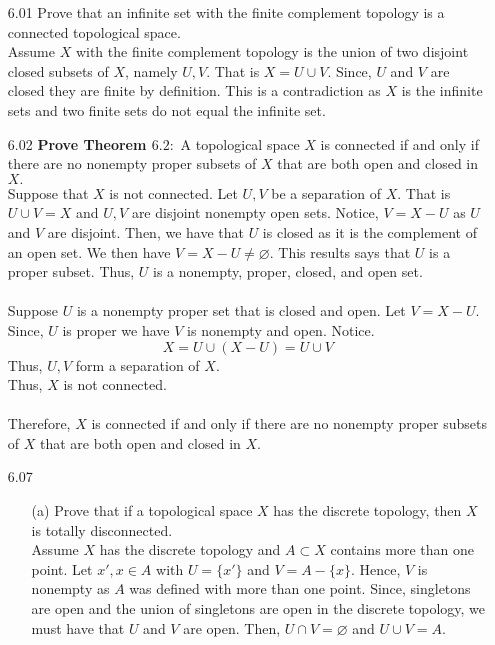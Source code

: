 \documentclass[12pt]{article}
\begin{document}
	\pagestyle{fancy}  
	\lfoot{} \cfoot{} \rfoot{}
	
	\begin{enumerate}
		\item[6.01] Prove that an infinite set with the finite complement topology is a connected
		topological space.\\
		Assume $ X $ with the finite complement topology is the union of two disjoint closed subsets of $ X $, namely $ U,V $. That is $ X= U\cup V $. Since, $ U$ and $V $ are closed they are finite by definition. This is a contradiction as $ X $ is the infinite sets and two finite sets do not equal the infinite set.
		
		\item[6.02] \textbf{Prove Theorem $6.2 :$} A topological space $X$ is connected if and only if there are no nonempty proper subsets of $X$ that are both open and closed in $X .$\\
		Suppose that $ X $ is not connected. Let $ U,V $ be a separation of $ X $. That is $ U\cup V = X$ and $ U,V $ are disjoint nonempty open sets. Notice, $ V=X-U  $ as $ U $ and $ V $ are disjoint. Then, we have that $ U $ is closed as it is the complement of an open set. We then have $ V=X-U\not= \varnothing $. This results says that $ U $ is a proper subset. Thus, $ U $ is a nonempty, proper, closed, and open set.\\
		\\
		Suppose $ U$ is a nonempty proper set that is closed and open. Let $ V=X-U $. Since, $ U $ is proper we have $ V $ is nonempty and open. Notice.
			\[X=U\cup(X-U)=U\cup V\]
		Thus, $ U,V $ form a separation of $ X $.\\
		Thus, $ X $ is not connected.\\
		\\
		Therefore, $X$ is connected if and only if there are no nonempty proper subsets of $X$ that are both open and closed in $X .$\\
		\item[6.07] \begin{enumerate}
			\item[(a)]  Prove that if a topological space $X$ has the discrete topology, then $X$ is totally disconnected.\\
			Assume $ X $ has the discrete topology and $ A\subset X $ contains more than one point. Let $ x',x\in A $ with $ U=\{x'\} $ and  $V = A-\{x\} $. Hence, $ V $ is nonempty as $ A $ was defined with more than one point. Since, singletons are open and the union of singletons are open in the discrete topology, we must have that $ U $ and $ V $ are open. Then, $ U\cap V = \varnothing $ and $ U\cup V = A $. \\

\end{enumerate}
\end{enumerate}
\end{document}
